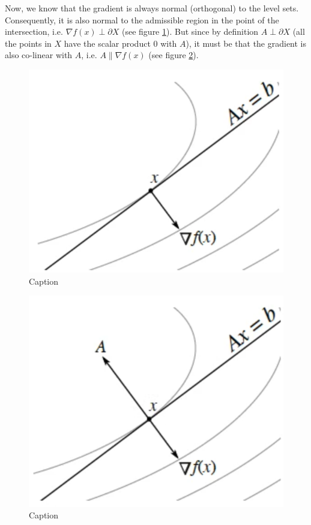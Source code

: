 \par Now, we know that the gradient is always normal (orthogonal) to the level sets. Consequently, it is also normal to the admissible region in the point of the intersection, i.e. $\nabla f(x) \perp \partial X$ (see figure \ref{fig:chapter3-constraint_equality_2}). But since by definition $A \perp \partial X$ (all the points in $X$ have the scalar product 0 with $A$), it must be that the gradient is also co-linear with $A$, i.e. $A \parallel \nabla f(x)$ (see figure \ref{fig:chapter3-constraint_equality_3}).
\begin{figure}
    \centering
    \includegraphics[scale=0.5]{figures/3/chapter3-constraint_equality_2.png}
    \caption{Caption}
    \label{fig:chapter3-constraint_equality_2}
\end{figure}
\begin{figure}
    \centering
    \includegraphics[scale=0.5]{figures/3/chapter3-constraint_equality_3.png}
    \caption{Caption}
    \label{fig:chapter3-constraint_equality_3}
\end{figure}
